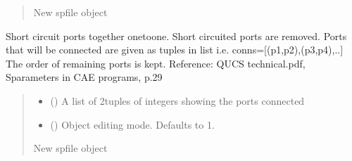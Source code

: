 \documentclass[letterpaper,10pt,english]{sphinxmanual}
\begin{document}
\begin{fulllineitems}
\begin{fulllineitems}
\begin{quote}
\begin{description}
\begin{itemize}
\end{itemize}

\sphinxAtStartPar
New spfile object

\sphinxAtStartPar
{\hyperref[\detokenize{touchstone:touchstone.spfile}]{}}

\end{description}\end{quote}

\end{fulllineitems}


\begin{fulllineitems}
\label{\detokenize{touchstone:touchstone.spfile.connect_2_ports_list}}
\pysigstartsignatures
{}
\pysigstopsignatures
\sphinxAtStartPar
Short circuit ports together one\sphinxhyphen{}to\sphinxhyphen{}one. Short circuited ports are removed.
Ports that will be connected are given as tuples in list 
i.e. conns={[}(p1,p2),(p3,p4),..{]}
The order of remaining ports is kept.
Reference: QUCS technical.pdf, S\sphinxhyphen{}parameters in CAE programs, p.29
\begin{quote}\begin{description}
\begin{itemize}
\item {} 
\sphinxAtStartPar
{} () \textendash{} A list of 2\sphinxhyphen{}tuples of integers showing the ports connected

\item {} 
\sphinxAtStartPar
{} (\sphinxstyleliteralemphasis{\sphinxupquote{, }}) \textendash{} Object editing mode. Defaults to \sphinxhyphen{}1.

\end{itemize}

\sphinxAtStartPar
New spfile object


\end{description}
\end{quote}
\end{fulllineitems}
\end{fulllineitems}
\end{document}
